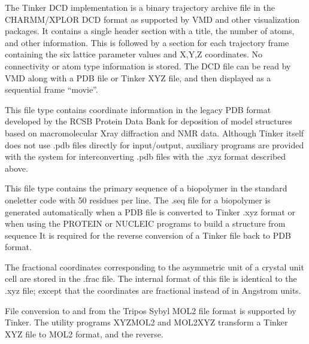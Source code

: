 \documentclass[letterpaper,11pt,english]{sphinxmanual}
\begin{document}
\sphinxAtStartPar
{}

\sphinxAtStartPar
The Tinker DCD implementation is a binary trajectory archive file in the CHARMM/XPLOR DCD format as supported by VMD and other visualization packages. It contains a single header section with a title, the number of atoms, and other information. This is followed by a section for each trajectory frame containing the six lattice parameter values and X,Y,Z coordinates. No connectivity or atom type information is stored. The DCD file can be read by VMD along with a PDB file or Tinker XYZ file, and then displayed as a sequential frame “movie”.

\sphinxAtStartPar
{}

\sphinxAtStartPar
This file type contains coordinate information in the legacy PDB format developed by the RCSB Protein Data Bank for deposition of model structures based on macromolecular X\sphinxhyphen{}ray diffraction and NMR data. Although Tinker itself does not use .pdb files directly for input/output, auxiliary programs are provided with the system for interconverting .pdb files with the .xyz format described above.

\sphinxAtStartPar
{}

\sphinxAtStartPar
This file type contains the primary sequence of a biopolymer in the standard one\sphinxhyphen{}letter code with 50 residues per line. The .seq file for a biopolymer is generated automatically when a PDB file is converted to Tinker .xyz format or when using the PROTEIN or NUCLEIC programs to build a structure from sequence It is required for the reverse conversion of a Tinker file back to PDB format.

\sphinxAtStartPar
{}

\sphinxAtStartPar
The fractional coordinates corresponding to the asymmetric unit of a crystal unit cell are stored in the .frac file. The internal format of this file is identical to the .xyz file; except that the coordinates are fractional instead of in Angstrom units.

\sphinxAtStartPar
{}

\sphinxAtStartPar
File conversion to and from the Tripos Sybyl MOL2 file format is supported by Tinker. The utility programs XYZMOL2 and MOL2XYZ transform a Tinker XYZ file to MOL2 format, and the reverse.

\sphinxAtStartPar
{}
\end{document}
